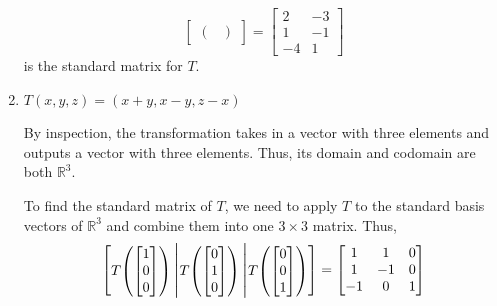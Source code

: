 \documentclass{article}
\begin{document}
\begin{enumerate}
\begin{solution}
\[\begin{bmatrix}
\begin{pmatrix}
                \end{pmatrix}
            \end{bmatrix} = \begin{bmatrix}
                2&-3\\1&-1\\-4&1
            \end{bmatrix}
        \] is the standard matrix for \(T\). 
    \end{solution}
    \item \(T(x,y,z) = (x+y, x-y, z-x)\)\begin{solution}
        By inspection, the transformation takes in a vector with three elements and outputs a vector with three elements. Thus, its domain and codomain are both \(\mathbb{R}^3\).\par 
        To find the standard matrix of \(T\), we need to apply \(T\) to the standard basis vectors of \(\mathbb{R}^3\) and combine them into one \(3 \times 3\) matrix. Thus,\[
            \begin{bmatrix}
                T\!\begin{pmatrix}
                    \begin{bmatrix}
                        1\\0\\0
                    \end{bmatrix}
                \end{pmatrix}\scalebox{1.3}{\Bigg|}T\!\begin{pmatrix}
                    \begin{bmatrix}
                        0\\1\\0
                    \end{bmatrix}
                \end{pmatrix}\scalebox{1.3}{\Bigg|}T\!\begin{pmatrix}
                    \begin{bmatrix}
                        0\\0\\1
                    \end{bmatrix}
                \end{pmatrix}
            \end{bmatrix} = \begin{bmatrix}
                1&1&0\\1&-1&0\\-1&0&1
            \end{bmatrix}
\]
\end{solution}
\end{enumerate}
\end{document}
